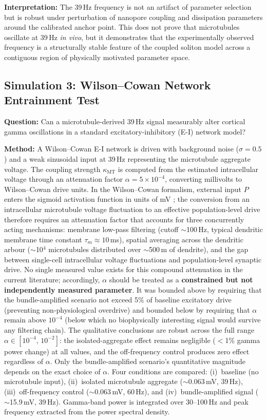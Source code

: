 \documentclass[10pt, a4paper, twocolumn]{article}
\begin{document}
\textbf{Interpretation:} The 39\,Hz frequency is not an artifact of
parameter selection but is robust under perturbation of nanopore
coupling and dissipation parameters around the calibrated anchor
point. This does not prove that microtubules oscillate at 39\,Hz
\emph{in vivo}, but it demonstrates that the experimentally observed
frequency is a structurally stable feature of the coupled soliton
model across a contiguous region of physically motivated parameter
space.

\subsection{Simulation 3: Wilson--Cowan Network Entrainment Test}
\label{sec:sim3}

\textbf{Question:} Can a microtubule-derived 39\,Hz signal measurably
alter cortical gamma oscillations in a standard excitatory-inhibitory
(E-I) network model?

\textbf{Method:} A Wilson--Cowan E-I network is driven with
background noise ($\sigma = 0.5$) and a weak sinusoidal input at
39\,Hz representing the microtubule aggregate voltage. The coupling
strength $\kappa_{\text{MT}}$ is computed from the estimated
intracellular voltage through an attenuation factor
$\alpha = 5 \times 10^{-4}$, converting millivolts to
Wilson--Cowan drive units. In the Wilson--Cowan formalism,
external input $P$ enters the sigmoid activation function
in units of mV \cite{wilson1972,negahbani2015}; the
conversion from an intracellular microtubule voltage
fluctuation to an effective population-level drive therefore
requires an attenuation factor that accounts for three
concurrently acting mechanisms: membrane low-pass filtering
(cutoff $\sim$100\,Hz, typical dendritic membrane time
constant $\tau_m \approx 10$\,ms), spatial averaging across
the dendritic arbour ($\sim$10$^4$ microtubules distributed
over $\sim$500\,\textmu m of dendrite), and the gap between
single-cell intracellular voltage fluctuations and
population-level synaptic drive. No single measured
value exists for this compound attenuation in the current
literature; accordingly, $\alpha$ should be treated as a
\textbf{constrained but not independently measured parameter}.
It was bounded above by requiring that the bundle-amplified
scenario not exceed 5\% of baseline excitatory drive (preventing
non-physiological overdrive) and bounded below by requiring that
$\alpha$ remain above $10^{-4}$ (below which no biophysically
interesting signal would survive any filtering chain). The
qualitative conclusions are robust across the full range
$\alpha \in [10^{-4},\, 10^{-2}]$: the isolated-aggregate effect
remains negligible ($<$1\% gamma power change) at all values, and
the off-frequency control produces zero effect regardless of
$\alpha$. Only the bundle-amplified scenario's quantitative
magnitude depends on the exact choice of $\alpha$.
Four conditions are compared: (i)~baseline (no microtubule input),
(ii)~isolated microtubule aggregate ($\sim$0.063\,mV, 39\,Hz),
(iii)~off-frequency control ($\sim$0.063\,mV, 60\,Hz), and
(iv)~bundle-amplified signal ($\sim$15.9\,mV, 39\,Hz).
Gamma-band power is integrated over 30--100\,Hz and peak frequency
extracted from the power spectral density.
\end{document}
